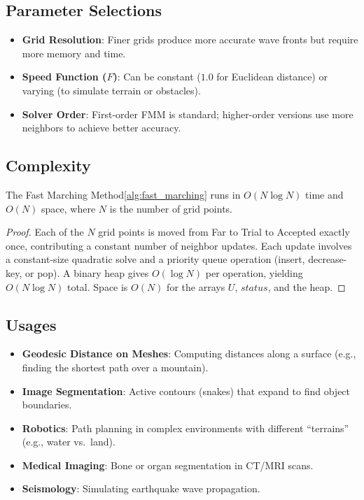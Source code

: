 \subsection{Parameter Selections}
\begin{itemize}
  \item \textbf{Grid Resolution}: Finer grids produce more accurate wave fronts but require more memory and time.
  \item \textbf{Speed Function ($F$)}: Can be constant ($1.0$ for Euclidean distance) or varying (to simulate terrain or obstacles).
  \item \textbf{Solver Order}: First-order FMM is standard; higher-order versions use more neighbors to achieve better accuracy.
\end{itemize}

\subsection{Complexity}
\begin{theorem}\label{thm:fmm_complexity}
The Fast Marching Method\cref{alg:fast_marching} runs in $O(N \log N)$ time and $O(N)$ space, where $N$ is the number of grid points.
\end{theorem}
\begin{proof}
Each of the $N$ grid points is moved from Far to Trial to Accepted exactly once, contributing a constant number of neighbor updates. Each update involves a constant-size quadratic solve and a priority queue operation (insert, decrease-key, or pop). A binary heap gives $O(\log N)$ per operation, yielding $O(N \log N)$ total. Space is $O(N)$ for the arrays $U$, $status$, and the heap.
\end{proof}

\subsection{Usages}
\begin{itemize}
  \item \textbf{Geodesic Distance on Meshes}: Computing distances along a surface (e.g., finding the shortest path over a mountain).
  \item \textbf{Image Segmentation}: Active contours (snakes) that expand to find object boundaries.
  \item \textbf{Robotics}: Path planning in complex environments with different ``terrains'' (e.g., water vs.\ land).
  \item \textbf{Medical Imaging}: Bone or organ segmentation in CT/MRI scans.
  \item \textbf{Seismology}: Simulating earthquake wave propagation.
\end{itemize}

